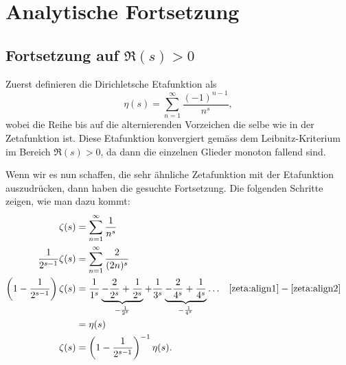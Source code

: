 \section{Analytische Fortsetzung} \label{zeta:section:analytische_fortsetzung}


\subsection{Fortsetzung auf $\Re(s) > 0$} \label{zeta:subsection:auf_bereich_ge_0}
Zuerst definieren die Dirichletsche Etafunktion als
\begin{equation}\label{zeta:equation:eta}
    \eta(s)
    =
    \sum_{n=1}^{\infty}
    \frac{(-1)^{n-1}}{n^s},
\end{equation}
wobei die Reihe bis auf die alternierenden Vorzeichen die selbe wie in der Zetafunktion ist.
Diese Etafunktion konvergiert gemäss dem Leibnitz-Kriterium im Bereich $\Re(s) > 0$, da dann die einzelnen Glieder monoton fallend sind.

Wenn wir es nun schaffen, die sehr ähnliche Zetafunktion mit der Etafunktion auszudrücken, dann haben die gesuchte Fortsetzung.
Die folgenden Schritte zeigen, wie man dazu kommt:
\begin{align}
    \zeta(s)
    &=
    \sum_{n=1}^{\infty}
    \frac{1}{n^s} \label{zeta:align1}
    \\
    \frac{1}{2^{s-1}}
    \zeta(s)
    &=
    \sum_{n=1}^{\infty}
    \frac{2}{(2n)^s} \label{zeta:align2}
    \\
    \left(1 - \frac{1}{2^{s-1}} \right)
    \zeta(s)
    &=
    \frac{1}{1^s}
    \underbrace{-\frac{2}{2^s} + \frac{1}{2^s}}_{-\frac{1}{2^s}}
    + \frac{1}{3^s}
    \underbrace{-\frac{2}{4^s} + \frac{1}{4^s}}_{-\frac{1}{4^s}}
    \ldots
    && \text{\eqref{zeta:align1}} - \text{\eqref{zeta:align2}}
    \\
    &= \eta(s)
    \\
    \zeta(s)
    &=
    \left(1 - \frac{1}{2^{s-1}} \right)^{-1} \eta(s).
\end{align}

